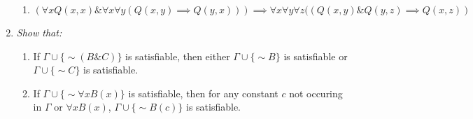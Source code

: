 \begin{enumerate}
\begin{enumerate}
      \item 
        \begin{question}
          $$(\forall x Q(x,x) \& \forall x \forall y (Q(x,y) \implies Q(y,x))) \implies \forall x \forall y \forall z ((Q(x,y) \& Q(y,z) \implies Q(x,z))$$
        \end{question}
    \end{enumerate}

  \item 
    \it{Show that:}

    \begin{enumerate}
      \item
        \begin{question}
          If $\Gamma \cup \{\sim (B \& C)\}$ is satisfiable, then either $\Gamma \cup \{\sim B \}$ is satisfiable or $\Gamma \cup \{\sim C\}$ is satisfiable.
        \end{question}
      \item
        \begin{question}
          If $\Gamma \cup \{\sim \forall x B(x) \}$ is satisfiable, then for any constant $c$ not occuring in $\Gamma$ or $\forall x B(x)$, $\Gamma \cup \{\sim B(c)\}$ is satisfiable.
        \end{question}
    \end{enumerate}
\end{enumerate}

